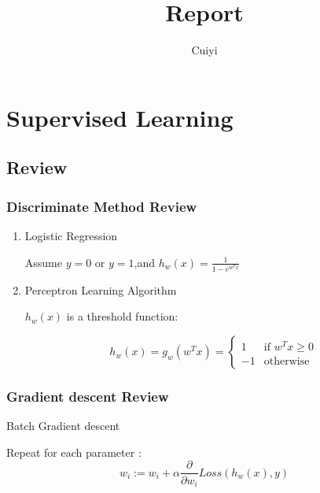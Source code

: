 \documentclass[slidestop,compress,mathserif]{beamer}
\title{Report}
\author{Cuiyi}
\institute{}
\begin{document}
\begin{frame} %
\titlepage
\end{frame}
\section{Supervised Learning}
    \subsection{Review}
    \begin{frame}[options]
        \frametitle{Discriminate Method Review}

        \begin{enumerate}
            \item Logistic Regression

                Assume $y=0$ or $y=1$,and $h_w(x)=\frac{1}{1-e^{w^Tx}}$
            \item Perceptron Learning Algorithm

                $h_w(x)$ is a threshold function:

                $$h_w(x) = g_w(w^Tx)=\left\{
                    \begin{array}{ll}
                        1  &\mbox{if $w^Tx \ge 0$}\\
                        -1  &\mbox{otherwise}
                    \end{array}
                    \right.
                $$
        \end{enumerate}

    \end{frame}
    \begin{frame}
        \frametitle{Gradient descent Review}
        Batch Gradient descent

            Repeat for each parameter :
            $$w_i := w_i + \alpha \frac{\partial}{\partial w_i}Loss(h_w(x),y)$$
        \begin{figure}
        \end{figure}



    \end{frame}
\end{document}
